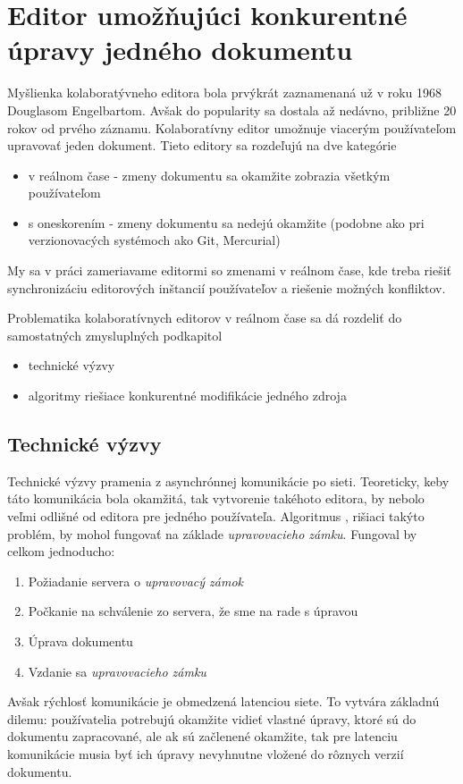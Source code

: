 \chapter{Editor umožňujúci konkurentné úpravy jedného dokumentu}

\label{kap:zdialtelnost} %

Myšlienka kolaboratývneho editora bola prvýkrát zaznamenaná už v roku 1968 Douglasom Engelbartom. 
Avšak do popularity sa dostala až nedávno, približne 20 rokov od prvého záznamu.
Kolaboratívny editor umožnuje viacerým používateľom upravovať jeden dokument.
Tieto editory sa rozdeľujú na dve kategórie
\begin{itemize}
  \item v reálnom čase - zmeny dokumentu sa okamžite zobrazia všetkým používateľom
  \item s oneskorením - zmeny dokumentu sa nedejú okamžite (podobne ako pri verzionovacých
  systémoch ako Git, Mercurial)
\end{itemize}
My sa v práci zameriavame editormi so zmenami v reálnom čase, kde treba
riešiť synchronizáciu editorových inštancií používateľov a riešenie možných konfliktov.

Problematika kolaboratívnych editorov v reálnom čase sa dá rozdeliť do samostatných zmysluplných 
podkapitol
\begin{itemize}
\item  technické výzvy
\item  algoritmy riešiace konkurentné modifikácie jedného zdroja
\end{itemize}

\section{Technické výzvy}
Technické výzvy pramenia z asynchrónnej komunikácie po sieti. Teoreticky, keby táto 
komunikácia bola okamžitá, tak vytvorenie takéhoto editora, by nebolo veľmi odlišné od
editora pre jedného používateľa. Algoritmus \label{algo:nesubezne_editovanie}, 
rišiaci takýto problém,  by mohol fungovať na  základe 
\textit{upravovacieho zámku}. Fungoval by celkom jednoducho:
\begin{enumerate}
  \item Požiadanie servera o \textit{upravovacý zámok}
  \item Počkanie na schválenie zo servera, že sme na rade s úpravou
  \item Úprava dokumentu
  \item Vzdanie sa \textit{upravovacieho zámku}
\end{enumerate}
Avšak rýchlosť komunikácie je obmedzená latenciou siete. To vytvára základnú dilemu: 
používatelia potrebujú okamžite vidieť vlastné úpravy, ktoré sú do dokumentu zapracované,
ale ak sú začlenené okamžite, tak pre latenciu komunikácie musia byť ich
úpravy nevyhnutne vložené do rôznych verzií dokumentu.

